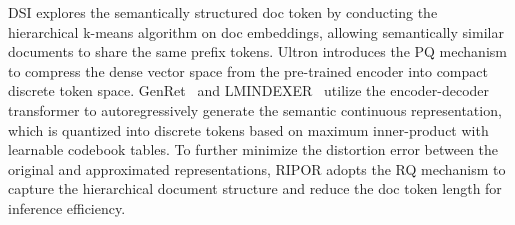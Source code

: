 DSI \cite{tay2022transformer} explores the semantically structured doc token by conducting the hierarchical k-means algorithm on doc embeddings, allowing semantically similar documents to share the same prefix tokens.
Ultron \cite{zhou2022ultron} introduces the PQ mechanism to compress the dense vector space from the pre-trained encoder into compact discrete token space.
GenRet~\cite{sun2024learning} and LMINDEXER~\cite{jin2023language} utilize the encoder-decoder transformer to autoregressively generate the semantic continuous representation, which is quantized into discrete tokens based on maximum inner-product with learnable codebook tables.
To further minimize the distortion error between the original and approximated representations, RIPOR \cite{zeng2024scalable} adopts the RQ mechanism to capture the hierarchical document structure and reduce the doc token length for inference efficiency.